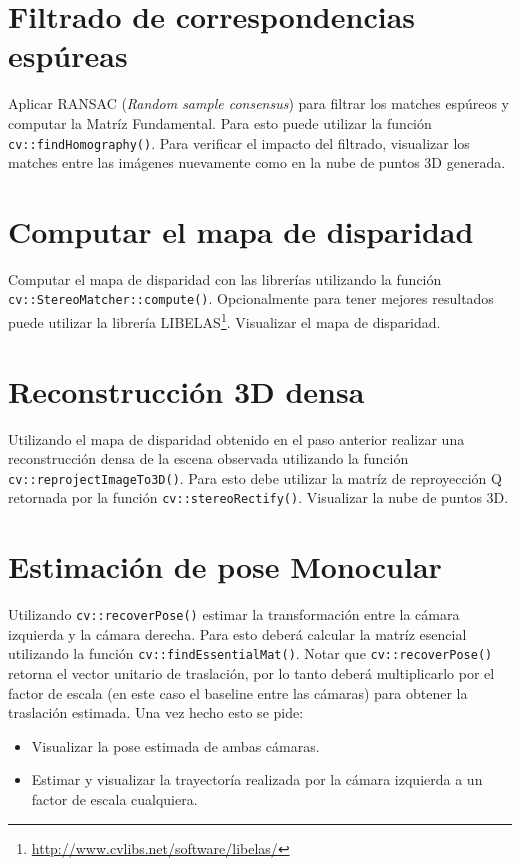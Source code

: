 \documentclass[tp]{lcc}
\begin{document}
\section{Filtrado de correspondencias espúreas}
Aplicar RANSAC (\emph{Random sample consensus}) para filtrar los matches espúreos y computar la Matríz Fundamental. Para esto puede utilizar la función \lstinline{cv::findHomography()}. Para verificar el impacto del filtrado, visualizar los matches entre las imágenes nuevamente como en la nube de puntos 3D generada.

\section{Computar el mapa de disparidad}
Computar el mapa de disparidad con las librerías utilizando la función \lstinline{cv::StereoMatcher::compute()}. Opcionalmente para tener mejores resultados puede utilizar la librería LIBELAS\footnote{\url{http://www.cvlibs.net/software/libelas/}}. Visualizar el mapa de disparidad.

\section{Reconstrucción 3D densa}
Utilizando el mapa de disparidad obtenido en el paso anterior realizar una reconstrucción densa de la escena observada utilizando la función \lstinline{cv::reprojectImageTo3D()}. Para esto debe utilizar la matríz de reproyección Q retornada por la función \lstinline{cv::stereoRectify()}. Visualizar la nube de puntos 3D.

\section{Estimación de pose Monocular}
Utilizando \lstinline{cv::recoverPose()} estimar la transformación entre la cámara izquierda y la cámara derecha. Para esto deberá calcular la matríz esencial utilizando la función \lstinline{cv::findEssentialMat()}. Notar que \lstinline{cv::recoverPose()} retorna el vector unitario de traslación, por lo tanto deberá multiplicarlo por el factor de escala (en este caso el baseline entre las cámaras) para obtener la traslación estimada. Una vez hecho esto se pide:


\begin{itemize}
    \item Visualizar la pose estimada de ambas cámaras.
    \item Estimar y visualizar la trayectoría realizada por la cámara izquierda a un factor de escala cualquiera.
\end{itemize}
\end{document}
